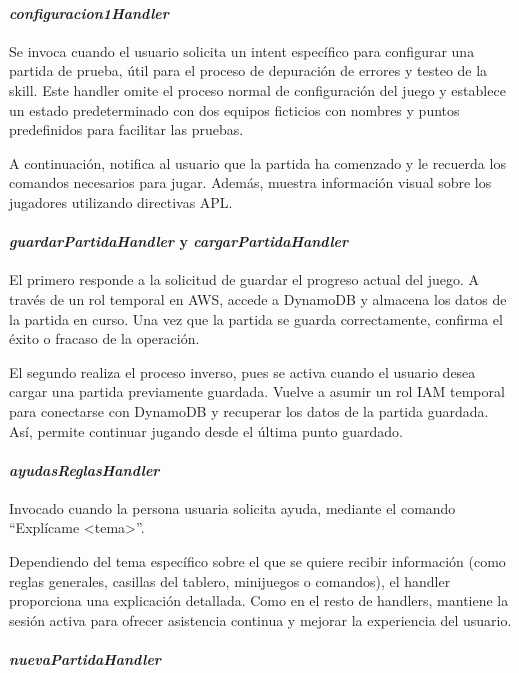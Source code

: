 \paragraph{\textit{configuracion1Handler}}

Se invoca cuando el usuario solicita un intent específico para configurar una partida de prueba, útil para el proceso de depuración de errores y testeo de la skill. Este handler omite el proceso normal de configuración del juego y establece un estado predeterminado con dos equipos ficticios con nombres y puntos predefinidos para facilitar las pruebas. 

A continuación, notifica al usuario que la partida ha comenzado y le recuerda los comandos necesarios para jugar. Además, muestra información visual sobre los jugadores utilizando directivas APL.

\paragraph{\textit{guardarPartidaHandler} y \textit{cargarPartidaHandler}}

El primero responde a la solicitud de guardar el progreso actual del juego. A través de un rol temporal en AWS, accede a DynamoDB y almacena los datos de la partida en curso. Una vez que la partida se guarda correctamente, confirma el éxito o fracaso de la operación.

El segundo realiza el proceso inverso, pues se activa cuando el usuario desea cargar una partida previamente guardada. Vuelve a asumir un rol IAM temporal para conectarse con DynamoDB y recuperar los datos de la partida guardada. Así, permite continuar jugando desde el última punto guardado. 

\paragraph{\textit{ayudasReglasHandler}}

Invocado cuando la persona usuaria solicita ayuda, mediante el comando \enquote{Explícame <tema>}.

Dependiendo del tema específico sobre el que se quiere recibir información (como reglas generales, casillas del tablero, minijuegos o comandos), el handler proporciona una explicación detallada. Como en el resto de handlers, mantiene la sesión activa para ofrecer asistencia continua y mejorar la experiencia del usuario.

\paragraph{\textit{nuevaPartidaHandler}}

